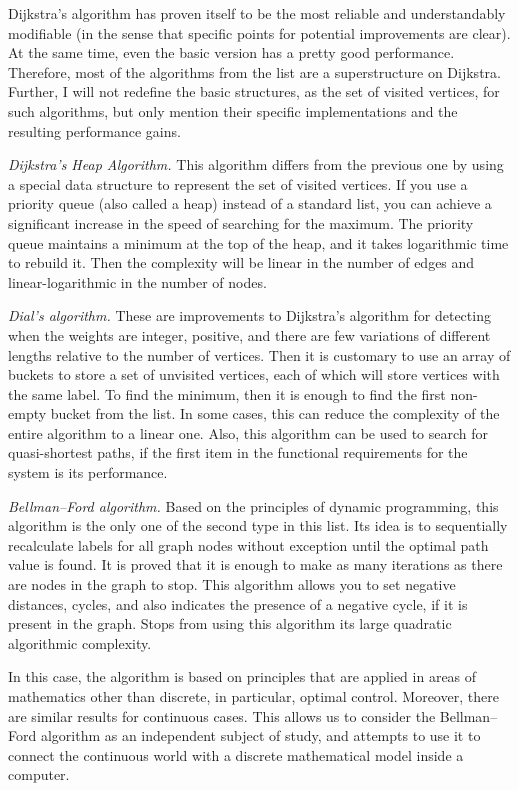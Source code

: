     Dijkstra's algorithm has proven itself to be the most reliable and understandably modifiable (in the sense that specific points for potential improvements are clear).
    At the same time, even the basic version has a pretty good performance.
    Therefore, most of the algorithms from the list are a superstructure on Dijkstra.
    Further, I will not redefine the basic structures, as the set of visited vertices, for such algorithms, but only mention their specific implementations and the resulting performance gains.

    \textit{Dijkstra's Heap Algorithm.}
    This algorithm differs from the previous one by using a special data structure to represent the set of visited vertices.
    If you use a priority queue (also called a heap) instead of a standard list, you can achieve a significant increase in the speed of searching for the maximum.
    The priority queue maintains a minimum at the top of the heap, and it takes logarithmic time to rebuild it.
    Then the complexity will be linear in the number of edges and linear-logarithmic in the number of nodes.
    
    \textit{Dial's algorithm.}
    These are improvements to Dijkstra's algorithm for detecting when the weights are integer, positive, and there are few variations of different lengths relative to the number of vertices.
    Then it is customary to use an array of buckets to store a set of unvisited vertices, each of which will store vertices with the same label.
    To find the minimum, then it is enough to find the first non-empty bucket from the list.
    In some cases, this can reduce the complexity of the entire algorithm to a linear one.
    Also, this algorithm can be used to search for quasi-shortest paths, if the first item in the functional requirements for the system is its performance.

    \textit{Bellman--Ford algorithm.}
    Based on the principles of dynamic programming, this algorithm is the only one of the second type in this list.
    Its idea is to sequentially recalculate labels for all graph nodes without exception until the optimal path value is found.
    It is proved that it is enough to make as many iterations as there are nodes in the graph to stop.
    This algorithm allows you to set negative distances, cycles, and also indicates the presence of a negative cycle, if it is present in the graph.
    Stops from using this algorithm its large quadratic algorithmic complexity.

    In this case, the algorithm is based on principles that are applied in areas of mathematics other than discrete, in particular, optimal control.
    Moreover, there are similar results for continuous cases.
    This allows us to consider the Bellman--Ford algorithm as an independent subject of study, and attempts to use it to connect the continuous world with a discrete mathematical model inside a computer.

